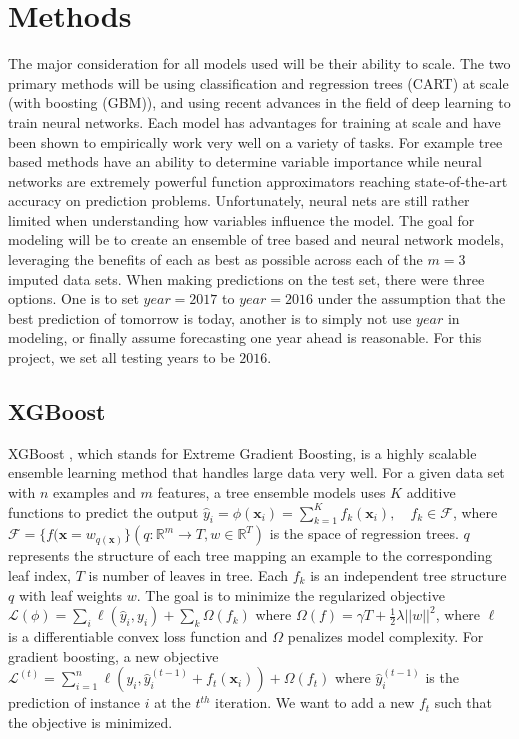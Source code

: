\documentclass[11pt]{article}
\theoremstyle{remark}
\theoremstyle{definition}
\begin{document}
\section{Methods}
The major consideration for all models used will be their ability to scale. The two primary methods will be using classification and regression trees (CART) at scale (with boosting (GBM)), and using recent advances in the field of deep learning to train neural networks. Each model has advantages for training at scale and have been shown to empirically work very well on a variety of tasks. For example tree based methods have an ability to determine variable importance while neural networks are extremely powerful function approximators reaching state-of-the-art accuracy on prediction problems. Unfortunately, neural nets are still rather limited when understanding how variables influence the model. The goal for modeling will be to create an ensemble of tree based and neural network models, leveraging the benefits of each as best as possible across each of the $m=3$ imputed data sets. When making predictions on the test set, there were three options. One is to set $year=2017$ to $year=2016$ under the assumption that the best prediction of tomorrow is today, another is to simply not use $year$ in modeling, or finally assume forecasting one year ahead is reasonable. For this project, we set all testing years to be $2016$.
\subsection{XGBoost}
XGBoost \citep{chen2016}, which stands for Extreme Gradient Boosting, is a highly scalable ensemble learning method that handles large data very well. For a given data set with $n$ examples and $m$ features, a tree ensemble models uses $K$ additive functions to predict the output $\hat{y}_i = \phi(\mathbf{x}_i) = \sum\limits_{k=1}^{K} f_k(\mathbf{x}_i), \quad f_k \in \mathcal{F}$, where $\mathcal{F} = \{f(\mathbf{x} = w_{q(\mathbf{x})}\}(q: \mathbb{R}^{m} \rightarrow T, w \in \mathbb{R}^{T})$ is the space of regression trees. $q$ represents the structure of each tree mapping an example to the corresponding leaf index, $T$ is number of leaves in tree. Each $f_k$ is an independent tree structure $q$ with leaf weights $w$. The goal is to minimize the regularized objective $\mathcal{L}(\phi) = \sum\limits_{i} \ell(\hat{y}_i, y_i) + \sum\limits_{k} \Omega(f_k)$ where $\Omega(f) = \gamma T + \frac{1}{2} \lambda ||w||^2$, where $\ell$ is a differentiable convex loss function and $\Omega$ penalizes model complexity. For gradient boosting, a new objective $\mathcal{L}^{(t)} = \sum\limits_{i=1}^n \ell(y_i, \hat{y}_i^{(t-1)} + f_t(\mathbf{x}_i)) + \Omega(f_t)$ where $\hat{y}_i^{(t-1)}$ is the prediction of instance $i$ at the $t^{th}$ iteration. We want to add a new $f_t$ such that the objective is minimized.
\end{document}
